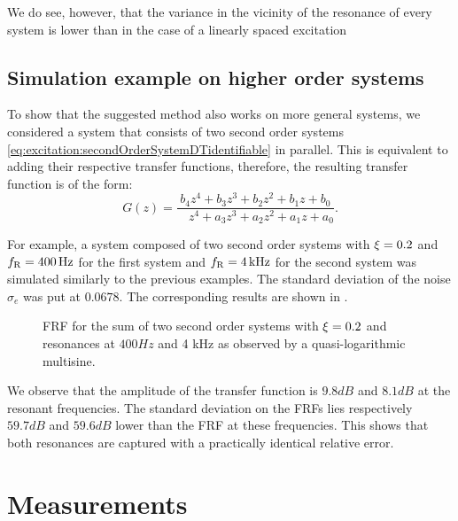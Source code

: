   We do see, however, that the variance in the vicinity of the resonance of every system is lower than in the case of a linearly spaced excitation 


  \subsection{Simulation example on higher order systems}
To show that the suggested method also works on more general systems, we considered a system that consists of two second order systems \eqref{eq:excitation:secondOrderSystemDTidentifiable} in parallel. This is equivalent to adding their respective transfer functions, therefore, the resulting transfer function is of the form:
\begin{equation}
  G \left( z \right) 
  = \frac{         b_4 z^{4} + b_3 z^{3} + b_2 z^{2} + b_1 z + b_0}%
         {\phantom{a_4}z^{4} + a_3 z^{3} + a_2 z^{2} + a_1 z + a_0}
  \text{.}
\label{eq:excitation:tfO4}
\end{equation}

For example, a system composed of two second order systems with $\xi_{} = 0.2$ and $f_{\mathrm{R}} = 400 \,\mathrm{Hz}$ for the first system and $f_{\mathrm{R}}=4 \,\mathrm{kHz}$ for the second system was simulated similarly to the previous examples. The standard deviation of the noise $\sigma_e$ was put at $0.0678$. The corresponding results are  shown in .

\begin{figure}%
  \centering
  \setlength{}
  \setlength\figureheight{0.68\figurewidth}
  
  \caption{FRF for the sum of two second order systems with $\xi_{}=0.2$ and
           resonances at $ 400 \unit{Hz}$ and 4 \unit{kHz} as observed by a quasi-logarithmic multisine.}%
  \label{fig:excitation:sumSys}
\end{figure}

We observe that the amplitude of the transfer function is $9.8\unit{dB}$ and $8.1\unit{dB}$ at the resonant frequencies.
The standard deviation on the \glspl{FRF} lies respectively $59.7 \unit{dB}$ and $59.6 \unit{dB}$ lower than the \gls{FRF} at these frequencies. 
This shows that both resonances are captured with a practically identical relative error.
  
\section{Measurements} 
\label{sec:excitation:measurement}
